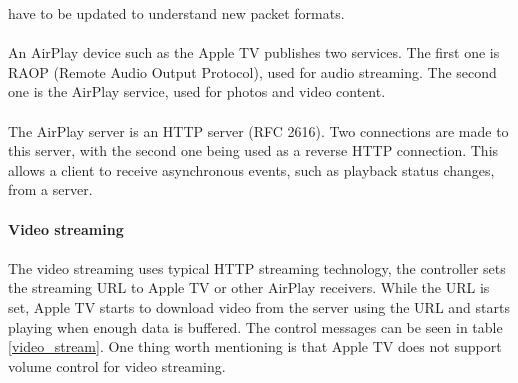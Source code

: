 have to be updated to understand new packet formats. \\
\\
An AirPlay device such as the Apple TV publishes two services. The first one is 
RAOP (Remote Audio Output Protocol), used for audio streaming. The second 
one is the AirPlay service, used for photos and video content. \\
\\
The AirPlay server is an HTTP server (RFC 2616). Two connections are made to this 
server, with the second one being used as a reverse HTTP connection. This allows a 
client to receive asynchronous events, such as playback status changes, from a 
server. \\
\\
\textbf{Video streaming} \\
\\ 
The video streaming uses typical HTTP streaming technology, the controller sets 
the streaming URL to Apple TV or other AirPlay receivers. While the URL is set, 
Apple TV starts to download video from the server using the URL and starts 
playing when enough data is buffered. The control messages can be seen in 
table \ref{video_stream}. One thing worth mentioning is that Apple TV does
not support volume control for video streaming.\\
\begin{table}[htb] 
\caption{AirPlay Video Control HTTP requests \label{video_stream}} 
\begin{center} 
\end{center} 
\end{table} 
